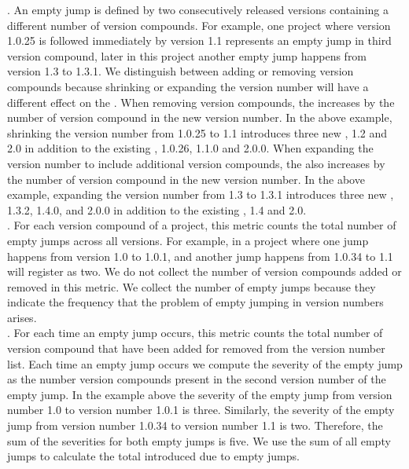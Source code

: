 \documentclass[conference]{IEEEtran}
\begin{document}
. An empty jump is defined by two consecutively released versions containing a different number of version compounds. 
For example, one project where version 1.0.25 is followed immediately by version 1.1 represents an empty jump in third version compound, later in this project another empty jump happens from version 1.3 to 1.3.1. 
We distinguish between adding or removing version compounds because shrinking or expanding the version number will have a different effect on the \numberchoices. 
When removing version compounds, the \numberchoices increases by the number of version compound in the new version number. In the above example, shrinking the version number from 1.0.25 to 1.1 introduces three new \choices, 1.2 and 2.0 in addition to the existing \choices, 1.0.26, 1.1.0 and 2.0.0. 
When expanding the version number to include additional version compounds, the \numberchoices also increases by the number of version compound in the new version number. In the above example, expanding the version number from 1.3 to 1.3.1 introduces three new \choices, 1.3.2, 1.4.0, and 2.0.0 in addition to the existing \choices, 1.4 and 2.0. \\



.  For each version compound of a project, this metric counts the total number of empty jumps across all versions. For example, in a project where one jump happens from version 1.0 to 1.0.1, and another jump happens from 1.0.34 to 1.1 will register as two.
We do not collect the number of version compounds added or removed in this metric.
We collect the number of empty jumps because they indicate the frequency that the problem of empty jumping in version numbers arises. \\

.  For each time an empty jump occurs, this metric counts the total number of version compound that have been added for removed from the version number list. 
Each time an empty jump occurs we compute the severity of the empty jump as the number version compounds present in the second version number of the empty jump.
In the example above the severity of the empty jump from version number 1.0 to version number 1.0.1 is three.
Similarly, the severity of the empty jump from version number 1.0.34 to version number 1.1 is two.
Therefore, the sum of the severities for both empty jumps is five.
We use the sum of all empty jumps to calculate the total \numberchoices introduced due to empty jumps. \\
\end{document}
